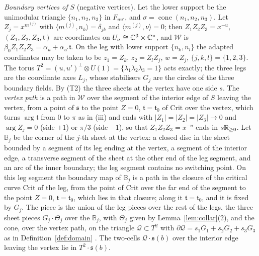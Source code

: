 \emph{Boundary vertices of $S$} (negative vertices). Let the lower support be the unimodular triangle $\{n_1,n_2,n_3\}$ in
$F_{uu'}$, and $\sigma=\operatorname{cone}(n_1,n_2,n_3)$. Let $Z_j=x^{m^{(j)}}$ with $\langle m^{(j)},n_k\rangle=\delta_{jk}$ and
$\langle m^{(j)},\nu\rangle=0$; then $Z_1Z_2Z_3=x^{-u}$, $(Z_1,Z_2,Z_3,\mathfrak t)$ are coordinates on
$U_\sigma\cong\mathbb C^3\times\mathbb C^*$, and $\mathscr W$ is $\beta_0Z_1Z_2Z_3=\alpha_u+\alpha_{u'}\mathfrak t$. On the leg with lower support
$\{n_k,n_l\}$ the adapted coordinates may be taken to be $z_1=Z_k$, $z_2=Z_lZ_j$, $w=Z_j$, $\{j,k,l\}=\{1,2,3\}$. The torus
$T^2=(u,u')^\perp\otimes U(1)=\{\lambda_1\lambda_2\lambda_3=1\}$ acts exactly; the three legs are the coordinate axes $L_j$,
whose stabilisers $G_j$ are the circles of the three boundary fields. By (T2) the three sheets at the vertex have one side
$s$. The \emph{vertex path} is a path in $\mathscr W$ over the segment of the interior edge of $S$ leaving the vertex, from a
point of $\mathfrak s$ to the point $Z=0$, $\mathfrak t=\mathfrak t_0$ of $\mathrm{Crit}$ over the vertex, which turns
$\arg\mathfrak t$ from $0$ to $\pi$ as in (iii) and ends with $|Z_1|=|Z_2|=|Z_3|\to0$ and $\arg Z_j=0$ (side $+1$) or $\pi/3$
(side $-1$), so that $Z_1Z_2Z_3=x^{-u}$ ends in $s\mathbb R_{\ge0}$. Let $\mathbb B_j$ be the corner of the $j$-th sheet at the
vertex: a closed disc in the sheet bounded by a segment of its leg ending at the vertex, a segment of the interior edge, a
transverse segment of the sheet at the other end of the leg segment, and an arc of the inner boundary; the leg segment contains no
switching point. On this leg segment the boundary map of $\mathbb B_j$ is a path in the closure of the critical curve
$\mathrm{Crit}$ of the leg, from the point of $\mathrm{Crit}$ over the far end of the segment to the point $Z=0$,
$\mathfrak t=\mathfrak t_0$, which lies in that closure; along it $\mathfrak t=\mathfrak t_0$, and it is fixed by $G_j$. The piece
is the union of the leg pieces over the rest of the legs, the three sheet pieces $G_j\cdot\Theta_j$
over the $\mathbb B_j$, with $\Theta_j$ given by Lemma~\ref{lem:collar}(2), and the cone, over the vertex path, on the triangle
$\mathcal Q\subset T^2$ with $\partial\mathcal Q=s_1G_1+s_2G_2+s_3G_3$ as in Definition~\ref{def:domain} \cite[\S7.5]{CBM}. The two-cells $\mathcal Q\cdot\mathfrak s(b)$
over the interior edge leaving the vertex lie in $T^2\cdot\mathfrak s(b)$.

